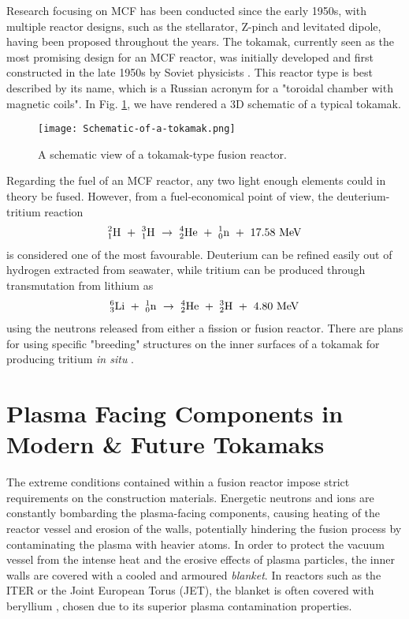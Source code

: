 Research focusing on MCF has been conducted since the early 1950s, with multiple reactor designs, such as the stellarator, Z-pinch and levitated dipole, having been proposed throughout the years. 
The tokamak, currently seen as the most promising design for an MCF reactor, was initially developed and first constructed in the late 1950s by Soviet physicists \cite{tokamakorigins}. 
This reactor type is best described by its name, which is a Russian acronym for a "toroidal chamber with magnetic coils".
In Fig. \ref{fig:tokamak}, we have rendered a 3D schematic of a typical tokamak.

\begin{figure}[!ht]
\center
\texttt{[image: Schematic-of-a-tokamak.png]}
\caption{A schematic view of a tokamak-type fusion reactor.} 
\label{fig:tokamak}
\end{figure}

Regarding the fuel of an MCF reactor, any two light enough elements could in theory be fused. 
However, from a fuel-economical point of view, the deuterium-tritium reaction 
\begin{align}
^2_1\rm{H} ~+~ ^3_1\rm{H} ~\rightarrow~ ^4_2\rm{He} ~+~ ^1_0\rm{n} ~+~ 17.58 ~\rm{MeV}
\label{Eq:D-T-reaction}
\end{align}
is considered one of the most favourable. 
Deuterium can be refined easily out of hydrogen extracted from seawater, while tritium can be produced through transmutation from lithium as
\begin{align}
^6_3\rm{Li} ~+~ ^1_0\rm{n} ~\rightarrow~ ^4_2\rm{He} ~+~ ^3_2\rm{H} ~+~ 4.80  ~\rm{MeV}
\end{align}
using the neutrons released from either a fission or fusion reactor. 
There are plans for using specific "breeding" structures on the inner surfaces of a tokamak for producing tritium \textit{in situ} \cite{giancarli2012overview}.


\section{Plasma Facing Components in Modern \& Future Tokamaks}

The extreme conditions contained within a fusion reactor impose strict requirements on the construction materials. 
Energetic neutrons and ions are constantly bombarding the plasma-facing components, causing heating of the reactor vessel and erosion of the walls, potentially hindering the fusion process by contaminating the plasma with heavier atoms. 
In order to protect the vacuum vessel from the intense heat and the erosive effects of plasma particles, the inner walls are covered with a cooled and armoured \textit{blanket}. 
In reactors such as the ITER or the Joint European Torus (JET), the blanket is often covered with beryllium \cite{raffray2012overview}, chosen due to its superior plasma contamination properties.


